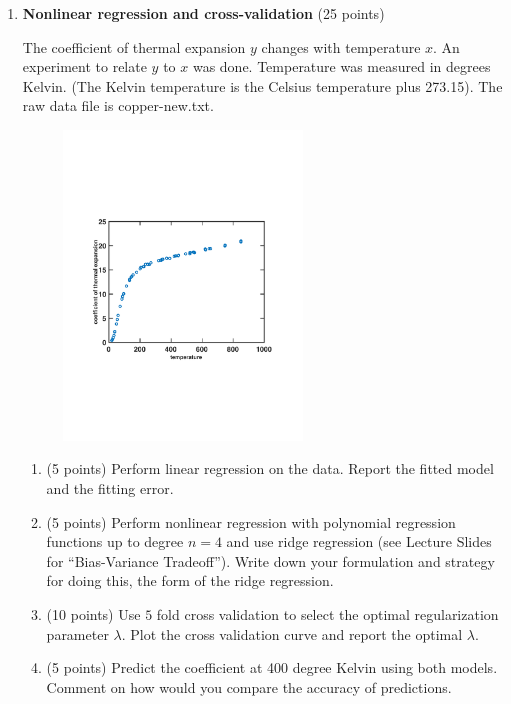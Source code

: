 \documentclass[twoside,12pt]{article}
\begin{document}
\begin{enumerate}
\clearpage

\item{\bf Nonlinear regression and cross-validation} (25 points)
 

The coefficient of thermal expansion $y$ changes with temperature $x$. An experiment to relate $y$ to $x$ was done. Temperature was measured in degrees Kelvin. (The Kelvin temperature is the Celsius temperature plus 273.15). The raw data file is \textsf{copper-new.txt}.

\begin{figure}[h!]
\begin{center}
\includegraphics[width = 0.6\textwidth]{t_c}
\end{center}
\end{figure}

\begin{enumerate}

\item (5 points) Perform linear regression on the data. Report the fitted model and the fitting error.
\item (5 points) Perform nonlinear regression with polynomial regression functions up to degree $n = 4$ and use ridge regression (see Lecture Slides for ``Bias-Variance Tradeoff''). Write down your formulation and strategy for doing this, the form of the ridge regression. 
\item (10 points) Use $5$ fold cross validation to select the optimal regularization parameter $\lambda$. Plot the cross validation curve and report the optimal $\lambda$.
\item (5 points) Predict the coefficient at 400 degree Kelvin using both models. Comment on how would you compare the accuracy of predictions. 
\end{enumerate}



\end{enumerate}
\end{document}
